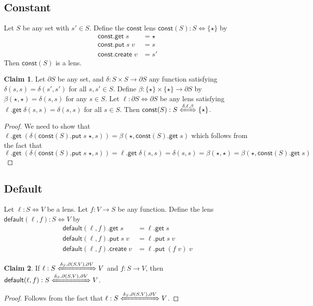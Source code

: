 \documentclass[acmsmall,review,anonymous]{acmart}\settopmatter{printfolios=true,printccs=false,printacmref=false}
\theoremstyle{definition}
\newtheorem{claim}{Claim}
\newcommand{\kw}[1]{\ensuremath{\mathsf{#1}}\xspace}
\newcommand{\get}{\ensuremath{\kw{get}}\xspace}
\newcommand{\pput}{\ensuremath{\kw{put}}\xspace}
\newcommand{\create}{\ensuremath{\kw{create}}\xspace}
\newcommand{\const}{\ensuremath{\kw{const}}\xspace}
\newcommand{\default}{\ensuremath{\kw{default}}\xspace}
\begin{document}
\subsection{Constant}
Let $S$ be any set with $s'\in S$. Define the \const lens $\const(S) : S
\Leftrightarrow \{\star\}$ by
\begin{align*}
\const.\get \; s &= \star\\
\const.\pput \; s \; v &= s\\
\const.\create \; v &= s'
\end{align*}
Then $\const(S)$ is a lens. 
\begin{claim}
Let $\partial S$ be any set, and $\delta : S \times S \longrightarrow \partial
S$ any function satisfying $\delta(s, s) = \delta(s', s')$ for all $s, s' \in
S$. Define $\beta : \{\star\} \times \{\star\} \longrightarrow \partial S$ by
$\beta(\star, \star) = \delta(s, s)$ for any $s \in S$. Let $\ell : \partial S
\Leftrightarrow \partial S$ be any lens satisfying $\ell.\get \; \delta(s, s) =
\delta(s, s)$ for all $s \in S$. Then $\const(S): S \xLeftrightarrow{\delta,
\ell, \beta} \{\star\}$.
\end{claim}
\begin{proof}
We need to show that $\ell.\get \; (\delta(\const(S).\pput \; s \; \star, s)) =
\beta (\star, \const(S).\get \; s)$
which follows from the fact that
$$ \ell.\get \; (\delta(\const(S).\pput \; s \; \star, s)) = \ell.\get
\; \delta(s, s) = \delta(s, s) = \beta(\star, \star) = \beta(\star,
\const(S).\get \; s)$$
\end{proof}

\subsection{Default}
Let $\ell : S \Leftrightarrow V$ be a lens. Let $f :
V \longrightarrow S$ be any function. Define the lens $\default(\ell, f) :
S \Leftrightarrow V$ by
\begin{align*}
\default(\ell, f).\get \; s &= \ell.\get \; s\\
\default(\ell, f).\pput \; s \; v &= \ell.\pput \; s \; v\\
\default(\ell, f).\create \; v &= \ell.\pput \; (f \; v) \; v
\end{align*}
 
\begin{claim}
If $\ell : S \xLeftrightarrow{\delta_S, \partial (S, V), \partial V}
V$ and $f: S \longrightarrow V$, then $\default(\ell, f) : S
\xLeftrightarrow{\delta_S, \partial (S, V), \partial V} V$.
\end{claim}
\begin{proof}
Follows from the fact that $\ell : S \xLeftrightarrow{\delta_S, \partial (S, V),
\partial V} V$.
\end{proof}
\end{document}
